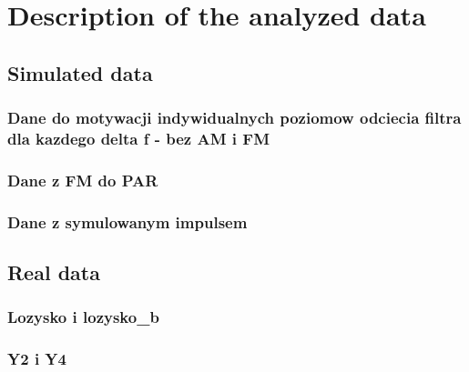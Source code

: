 \chapter{Description of the analyzed data}

\label{ch:analyzed_data}

\section{Simulated data}

\subsection{Dane do motywacji indywidualnych poziomow odciecia filtra dla kazdego delta f - bez AM i FM}

\subsection{Dane z FM do PAR}

\subsection{Dane z symulowanym impulsem}

\section{Real data}

\subsection{Lozysko i lozysko\_b}

\subsection{Y2 i Y4}